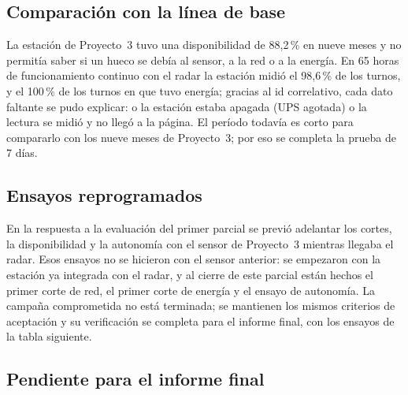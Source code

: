 \subsection*{Comparación con la línea de base}

La estación de Proyecto~3 tuvo una disponibilidad de 88,2\,\% en nueve meses
y no permitía saber si un hueco se debía al sensor, a la red o a la energía.
En 65 horas de funcionamiento continuo con el radar la estación midió el
98,6\,\% de los turnos, y el 100\,\% de los turnos en que tuvo energía; gracias
al id correlativo, cada dato faltante se pudo explicar: o la estación estaba
apagada (UPS agotada) o la lectura se midió y no llegó a la página. El período
todavía es corto para compararlo con los nueve meses de Proyecto~3; por eso se
completa la prueba de 7 días.

\subsection*{Ensayos reprogramados}

En la respuesta a la evaluación del primer parcial se previó adelantar los
cortes, la disponibilidad y la autonomía con el sensor de Proyecto~3 mientras
llegaba el radar. Esos ensayos no se hicieron con el sensor anterior: se
empezaron con la estación ya integrada con el radar, y al cierre de este
parcial están hechos el primer corte de red, el primer corte de energía y el
ensayo de autonomía. La campaña comprometida no está terminada; se mantienen
los mismos criterios de aceptación y su verificación se completa para el
informe final, con los ensayos de la tabla siguiente.

\subsection*{Pendiente para el informe final}

